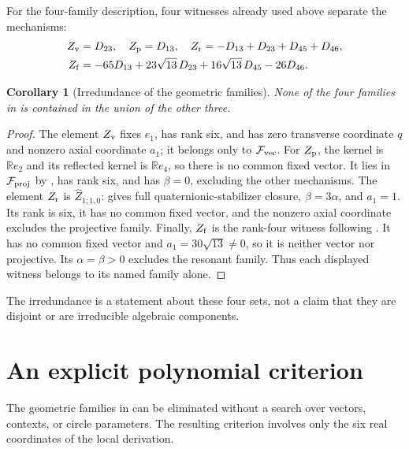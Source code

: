 \documentclass[11pt,a4paper]{article}
\newtheorem{corollary}[corollary]{Corollary}
\newcommand{\RR}{\mathbb R}
\begin{document}
For the four-family description, four witnesses already used above separate the mechanisms:
\[
\begin{split}
Z_{\rm v}&=D_{23},\quad Z_{\rm p}=D_{13},\quad
Z_{\rm r}=-D_{13}+D_{23}+D_{45}+D_{46},\\
Z_{\rm f}&=-65D_{13}+23\sqrt{13}\,D_{23}+16\sqrt{13}\,D_{45}-26D_{46}.
\end{split}
\]
\begin{corollary}[Irredundance of the geometric families]\label{cor:geometric-irredundance}
None of the four families in  is contained in the union of the other three.
\end{corollary}
\begin{proof}
The element $Z_{\rm v}$ fixes $e_1$, has rank six, and has zero transverse coordinate $q$ and nonzero axial coordinate $a_1$; it belongs only to $\mathcal F_{\rm vec}$.
For $Z_{\rm p}$, the kernel is $\RR e_2$ and its reflected kernel is $\RR e_4$, so there is no common fixed vector.  It lies in $\mathcal F_{\rm proj}$ by , has rank six, and has $\beta=0$, excluding the other mechanisms.
The element $Z_{\rm r}$ is $\widehat Z_{1;1,0}$:  gives full quaternionic-stabilizer closure, $\beta=3\alpha$, and $a_1=1$.  Its rank is six, it has no common fixed vector, and the nonzero axial coordinate excludes the projective family.
Finally, $Z_{\rm f}$ is the rank-four witness following .  It has no common fixed vector and $a_1=30\sqrt{13}\ne0$, so it is neither vector nor projective.  Its $\alpha=\beta>0$ excludes the resonant family.  Thus each displayed witness belongs to its named family alone.
\end{proof}
The irredundance is a statement about these four sets, not a claim that they are disjoint or are irreducible algebraic components.

\section{An explicit polynomial criterion}
\label{sec:scalar}

The geometric families in  can be eliminated without a search over vectors, contexts, or circle parameters.  The resulting criterion involves only the six real coordinates of the local derivation.
\end{document}
